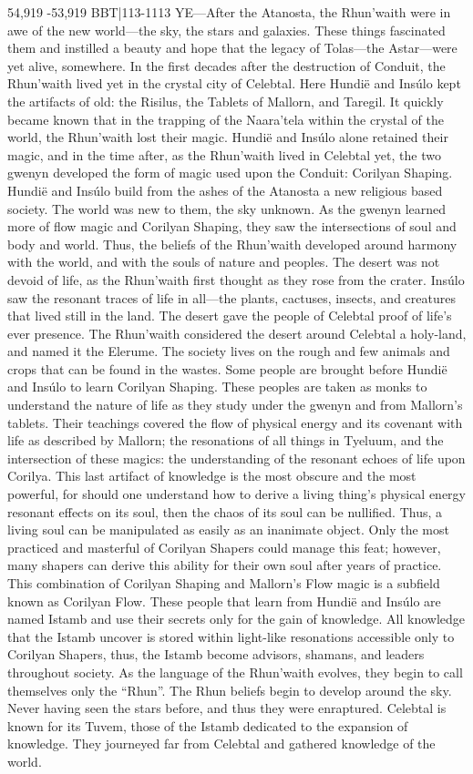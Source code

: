 \documentclass[smalldemyvopaper,11pt,twoside,onecolumn,openright,extrafontsizes]{memoir}
\begin{document}
54,919 -53,919 BBT|113-1113 YE—After the Atanosta, the Rhun’waith were in awe of the new world—the sky, the stars and galaxies. These things fascinated them and instilled a beauty and hope that the legacy of Tolas—the Astar—were yet alive, somewhere. In the first decades after the destruction of Conduit, the Rhun’waith lived yet in the crystal city of Celebtal. Here Hundië and Insúlo kept the artifacts of old: the Risilus, the Tablets of Mallorn, and Taregil. It quickly became known that in the trapping of the Naara’tela within the crystal of the world, the Rhun’waith lost their magic. Hundië and Insúlo alone retained their magic, and in the time after, as the Rhun’waith lived in Celebtal yet, the two gwenyn developed the form of magic used upon the Conduit: Corilyan Shaping.
	Hundië and Insúlo build from the ashes of the Atanosta a new religious based society. The world was new to them, the sky unknown. As the gwenyn learned more of flow magic and Corilyan Shaping, they saw the intersections of soul and body and world. Thus, the beliefs of the Rhun’waith developed around harmony with the world, and with the souls of nature and peoples. The desert was not devoid of life, as the Rhun’waith first thought as they rose from the crater. Insúlo saw the resonant traces of life in all—the plants, cactuses, insects, and creatures that lived still in the land. The desert gave the people of Celebtal proof of life’s ever presence. The Rhun’waith considered the desert around Celebtal a holy-land, and named it the Elerume. The society lives on the rough and few animals and crops that can be found in the wastes.
Some people are brought before Hundië and Insúlo to learn Corilyan Shaping. These peoples are taken as monks to understand the nature of life as they study under the gwenyn and from Mallorn’s tablets. Their teachings covered the flow of physical energy and its covenant with life as described by Mallorn; the resonations of all things in Tyeluum, and the intersection of these magics: the understanding of the resonant echoes of life upon Corilya. This last artifact of knowledge is the most obscure and the most powerful, for should one understand how to derive a living thing’s physical energy resonant effects on its soul, then the chaos of its soul can be nullified. Thus, a living soul can be manipulated as easily as an inanimate object. Only the most practiced and masterful of Corilyan Shapers could manage this feat; however, many shapers can derive this ability for their own soul after years of practice. This combination of Corilyan Shaping and Mallorn’s Flow magic is a subfield known as Corilyan Flow. These people that learn from Hundië and Insúlo are named Istamb and use their secrets only for the gain of knowledge. All knowledge that the Istamb uncover is stored within light-like resonations accessible only to Corilyan Shapers, thus, the Istamb become advisors, shamans, and leaders throughout society.
As the language of the Rhun’waith evolves, they begin to call themselves only the “Rhun”. The Rhun beliefs begin to develop around the sky. Never having seen the stars before, and thus they were enraptured.
Celebtal is known for its Tuvem, those of the Istamb dedicated to the expansion of knowledge. They journeyed far from Celebtal and gathered knowledge of the world.
\end{document}
